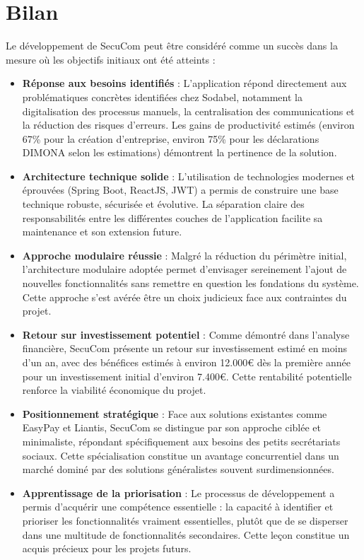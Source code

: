 \documentclass[12pt,a4paper]{report}
\begin{document}
\section{Bilan}

Le développement de SecuCom peut être considéré comme un succès dans la mesure où les objectifs initiaux ont été atteints :

\begin{itemize}
  \item \textbf{Réponse aux besoins identifiés} : L'application répond directement aux problématiques concrètes identifiées chez Sodabel, notamment la digitalisation des processus manuels, la centralisation des communications et la réduction des risques d'erreurs. Les gains de productivité estimés (environ 67\% pour la création d'entreprise, environ 75\% pour les déclarations DIMONA selon les estimations) démontrent la pertinence de la solution.

  \item \textbf{Architecture technique solide} : L'utilisation de technologies modernes et éprouvées (Spring Boot, ReactJS, JWT) a permis de construire une base technique robuste, sécurisée et évolutive. La séparation claire des responsabilités entre les différentes couches de l'application facilite sa maintenance et son extension future.

  \item \textbf{Approche modulaire réussie} : Malgré la réduction du périmètre initial, l'architecture modulaire adoptée permet d'envisager sereinement l'ajout de nouvelles fonctionnalités sans remettre en question les fondations du système. Cette approche s'est avérée être un choix judicieux face aux contraintes du projet.

  \item \textbf{Retour sur investissement potentiel} : Comme démontré dans l'analyse financière, SecuCom présente un retour sur investissement estimé en moins d'un an, avec des bénéfices estimés à environ 12.000€ dès la première année pour un investissement initial d'environ 7.400€. Cette rentabilité potentielle renforce la viabilité économique du projet.

  \item \textbf{Positionnement stratégique} : Face aux solutions existantes comme EasyPay et Liantis, SecuCom se distingue par son approche ciblée et minimaliste, répondant spécifiquement aux besoins des petits secrétariats sociaux. Cette spécialisation constitue un avantage concurrentiel dans un marché dominé par des solutions généralistes souvent surdimensionnées.

  \item \textbf{Apprentissage de la priorisation} : Le processus de développement a permis d'acquérir une compétence essentielle : la capacité à identifier et prioriser les fonctionnalités vraiment essentielles, plutôt que de se disperser dans une multitude de fonctionnalités secondaires. Cette leçon constitue un acquis précieux pour les projets futurs.
\end{itemize}
\end{document}
